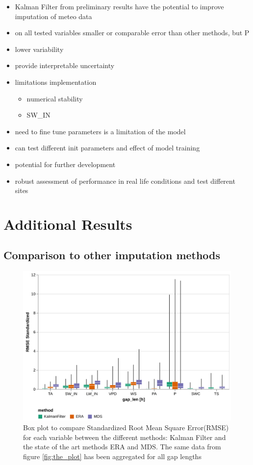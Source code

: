 \documentclass{article}
\newcommand{\imgwidth}{6in}
\let\Oldsection\section
\renewcommand{\section}{\FloatBarrier\Oldsection}
\let\Oldsubsection\subsection
\renewcommand{\subsection}{\FloatBarrier\Oldsubsection}
\begin{document}
\begin{itemize}
    \item Kalman Filter from preliminary results have the potential to improve imputation of meteo data
    \item on all tested variables smaller or comparable error than other methods, but P
    \item lower variability
    \item provide interpretable uncertainty
    \item limitations implementation
    \begin{itemize}
        \item numerical stability
        \item SW\_IN
    \end{itemize}
    \item need to fine tune parameters is a limitation of the model
    \item can test different init parameters and effect of model training
    \item potential for further development
    \item robust assessment of performance in real life conditions and test different sites
\end{itemize}


\printbibliography

\appendix

\FloatBarrier


\section{Additional Results}

\subsection{Comparison to other imputation methods}

\begin{figure}
    \centerline{\includegraphics[width=\imgwidth]{the_plot_stand}}
\caption{Box plot to compare Standardized Root Mean Square Error(RMSE) for each variable between the different methods: Kalman Filter and the state of the art methods ERA and MDS. The same data from figure \ref{fig:the_plot} has been aggregated for all gap lengths}
\label{fig:the_plot_stand}
\end{figure}
\end{document}
